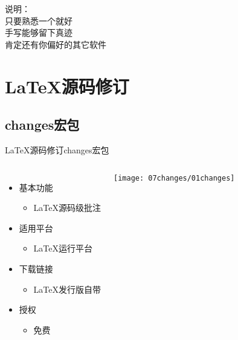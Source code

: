\documentclass[fontset = none, t, aspectratio=169]{ctexbeamer}
\begin{document}
\begin{frame}
  说明：\\  
  只要\alert{熟悉一个}就好\\
  手写能够留下\alert{真迹}\\
  肯定还有你偏好的其它软件
\end{frame}

\section{\LaTeX 源码修订}
\subsection{changes宏包}

\begin{frame}{\LaTeX 源码修订}{changes宏包}
    \begin{columns}[T]
    \begin{itemize}\itemsep=8pt
    \item 基本功能
      \begin{itemize}
      \item \LaTeX 源码级批注
      \end{itemize}
    \item 适用平台
      \begin{itemize}
      \item \LaTeX 运行平台
      \end{itemize}
    \item 下载链接
      \begin{itemize}
      \item \LaTeX 发行版自带
      \end{itemize}
    \item 授权
      \begin{itemize}
      \item \alert{免费}
      \end{itemize}
    \end{itemize}
    \centering
    \texttt{[image: 07changes/01changes]}
  \end{columns}
\end{frame}
\end{document}
